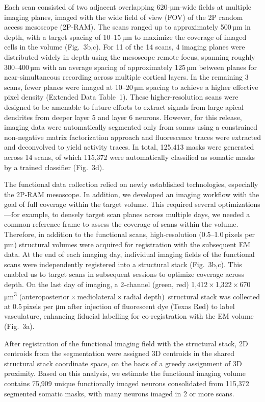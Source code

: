 \documentclass{article}
\begin{document}
Each scan consisted of two adjacent overlapping 620-µm-wide fields at multiple imaging planes, imaged with the wide field of view (FOV) of the 2P random access mesoscope (2P-RAM). The scans ranged up to approximately 500\,µm in depth, with a target spacing of 10–15\,µm to maximize the coverage of imaged cells in the volume (Fig.~3b,c). For 11 of the 14 scans, 4 imaging planes were distributed widely in depth using the mesoscope remote focus, spanning roughly 300–400\,µm with an average spacing of approximately 125\,µm between planes for near-simultaneous recording across multiple cortical layers. In the remaining 3 scans, fewer planes were imaged at 10–20\,µm spacing to achieve a higher effective pixel density (Extended Data Table~1). These higher-resolution scans were designed to be amenable to future efforts to extract signals from large apical dendrites from deeper layer 5 and layer 6 neurons. However, for this release, imaging data were automatically segmented only from somas using a constrained non-negative matrix factorization approach and fluorescence traces were extracted and deconvolved to yield activity traces. In total, 125,413 masks were generated across 14 scans, of which 115,372 were automatically classified as somatic masks by a trained classifier (Fig.~3d).

The functional data collection relied on newly established technologies, especially the 2P-RAM mesoscope. In addition, we developed an imaging workflow with the goal of full coverage within the target volume. This required several optimizations—for example, to densely target scan planes across multiple days, we needed a common reference frame to assess the coverage of scans within the volume. Therefore, in addition to the functional scans, high-resolution (0.5–1.0\,pixels per µm) structural volumes were acquired for registration with the subsequent EM data. At the end of each imaging day, individual imaging fields of the functional scans were independently registered into a structural stack (Fig.~3b,c). This enabled us to target scans in subsequent sessions to optimize coverage across depth. On the last day of imaging, a 2-channel (green, red) 1,412\,×\,1,322\,×\,670\,μm\textsuperscript{3} (anteroposterior\,×\,mediolateral\,×\,radial depth)~structural stack was collected at 0.5\,pixels per μm after injection of fluorescent dye (Texas Red) to label vasculature, enhancing fiducial labelling for co-registration with the EM volume (Fig.~3a).

After registration of the functional imaging field with the structural stack, 2D centroids from the segmentation were assigned 3D centroids in the shared structural stack coordinate space, on the basis of a greedy assignment of 3D proximity. Based on this analysis, we estimate the functional imaging volume contains 75,909 unique functionally imaged neurons consolidated from 115,372 segmented somatic masks, with many neurons imaged in 2 or more scans.
\end{document}
